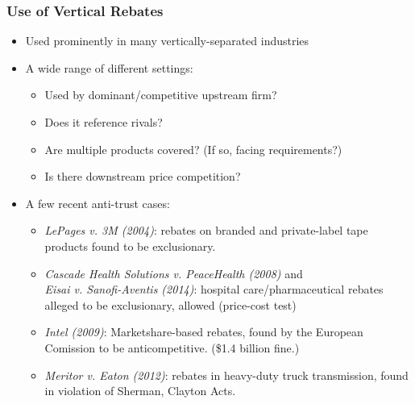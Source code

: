 \begin{frame}
\frametitle{Use of Vertical Rebates}
\begin{itemize}
\item Used prominently in many vertically-separated industries 
\item A wide range of different settings:
	\begin{itemize}
	\item Used by dominant/competitive upstream firm? 
	\item Does it reference rivals? 
	\item Are multiple products covered? (If so, facing requirements?)
	\item Is there downstream price competition?
	\end{itemize}
\item A few recent anti-trust cases: 
	\begin{itemize} \footnotesize
	\item \textit{LePages v. 3M (2004)}: rebates on branded and private-label tape products found to be exclusionary.
	\item \textit{Cascade Health Solutions v. PeaceHealth (2008)} and \\ \textit{Eisai v. Sanofi-Aventis (2014)}: hospital care/pharmaceutical rebates alleged to be exclusionary, allowed (price-cost test) \\
	\item \textit{Intel (2009)}: Marketshare-based rebates, found by the European Comission to be anticompetitive. (\$1.4 billion fine.)
	\item \textit{Meritor v. Eaton (2012)}: rebates in heavy-duty truck transmission, found in violation of Sherman, Clayton Acts.
	\end{itemize}
\end{itemize}
\end{frame}



